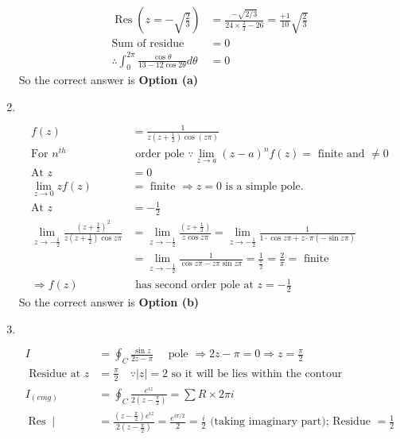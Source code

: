 \begin{enumerate}
\begin{answer}
\begin{align*}
	\operatorname{Res}\left(z=-\sqrt{\frac{2}{3}}\right)&=\frac{-\sqrt{2 / 3}}{24 \times \frac{2}{3}-26}=\frac{+1}{10} \sqrt{\frac{2}{3}}\\
	\text{Sum of residue }&=0\\
	\therefore \int_{0}^{2 \pi} \frac{\cos \theta}{13-12 \cos 2 \theta} d \theta&=0
		\end{align*}
			So the correct answer is \textbf{Option (a)}
	\end{answer}
		\item $\left. \right. $
	\begin{answer}
		\begin{align*}
		f(z)&=\frac{1}{z\left(z+\frac{1}{2}\right) \cos (z \pi)}\\
		\text{For }n^{t h}&\text{ order pole $\because \lim _{z \rightarrow a}(z-a)^{n} f(z)=$ finite and $\neq 0$}\\
		\text{At }z&=0\\
		\lim _{z \rightarrow 0} z f(z)&=\text{ finite }\Rightarrow z=0\text{ is a simple pole.}\\
		\text{At }z&=-\frac{1}{2}\\
		\lim _{z \rightarrow-\frac{1}{2}} \frac{\left(z+\frac{1}{2}\right)^{2}}{z\left(z+\frac{1}{2}\right) \cos z \pi}&=\lim _{z \rightarrow-\frac{1}{2}} \frac{\left(z+\frac{1}{2}\right)}{z \cos z \pi}=\lim _{z \rightarrow-\frac{1}{2}} \frac{1}{1 \cdot \cos z \pi+z \cdot \pi(-\sin z \pi)}\\
		&=\lim _{z \rightarrow-\frac{1}{2}} \frac{1}{\cos z \pi-z \pi \sin z \pi}=\frac{1}{\frac{\pi}{2}}=\frac{2}{\pi}=\text{ finite}\\
		\Rightarrow f(z)&\text{ has second order pole at }z=-\frac{1}{2}
		\end{align*}
		So the correct answer is \textbf{Option (b)}
	\end{answer}
	\item $\left. \right. $
	\begin{answer}
		\begin{align*}
		I&=\oint_{C} \frac{\sin z}{2 z-\pi} \quad\text{ pole }\Rightarrow 2 z-\pi=0 \Rightarrow z=\frac{\pi}{2}\\
	\text{	Residue at }z&=\frac{\pi}{2} \quad \because|z|=2\text{ so it will be lies within the contour}\\
		I_{(e m g)}&=\oint_{C} \frac{e^{i z}}{2\left(z-\frac{\pi}{2}\right)}=\sum R \times 2 \pi i\\
		\operatorname{Res} \mid&=\frac{\left(z-\frac{\pi}{2}\right) e^{i z}}{2\left(z-\frac{\pi}{2}\right)}=\frac{e^{i \pi / 2}}{2}=\frac{i}{2}\text{ (taking imaginary part); Residue $=\frac{1}{2}$}\\

\end{align*}
\end{answer}
\end{enumerate}
